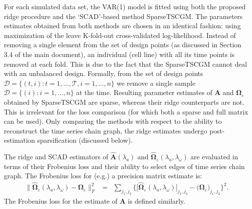 For each simulated data set, the VAR(1) model is fitted using both the proposed ridge procedure and the `SCAD'-based method SparseTSCGM. The parameters estimates obtained from both methods are chosen in an identical fashion: using maximization of the leave K-fold-out cross-validated log-likelihood. Instead of removing a single element from the set of design points (as discussed in Section 3.4 of the main document), an individual (cell line) with all its time points is removed at each fold. This is due to the fact that the SparseTSCGM cannot deal with an unbalanced design. Formally, from the set of design points $\mathcal{D} = \{ (t,i): t=1, \ldots, \mathcal{T}, i=1, \ldots, n \}$ we remove a single sample $\mathcal{D}=\{(i): i = 1, \ldots, n\}$ at the time. Resulting parameter estimates of $\mathbf{A}$ and $\boldsymbol{\Omega}_{\varepsilon}$ obtained by SparseTSCGM are sparse, whereas their ridge counterparts are not. This is irrelevant for the loss comparison (for which both a sparse and full matrix can be used). Only comparing the methods with respect to the ability to reconstruct the time series chain graph, the ridge estimates undergo post-estimation sparsification (discussed below).

The ridge and SCAD estimators of $\mathbf{\hat{A}}(\lambda_a)$ and $\widehat{\mathbf{\Omega}}_{\varepsilon}(\lambda_a, \lambda_{\omega})$ are evaluated in terms of their Frobenius loss and their ability to select edges of time series chain graph. The Frobenius loss for (e.g.) a precision  matrix estimate is:
\begin{eqnarray*}
\big\| \widehat{\mathbf{\Omega}}_{\varepsilon}(\lambda_a, \lambda_{\omega}) - \mathbf{\Omega}_{\varepsilon} \big\|_F^2  & = & \sum_{j_1, j_2} \Big\{ \big[ \widehat{\mathbf{\Omega}}_{\varepsilon}(\lambda_a, \lambda_{\omega}) ]_{j_1, j_2} - \big( \mathbf{\Omega}_{\varepsilon}
 )_{j_1, j_2} \Big\}^2.
\end{eqnarray*}
The Frobenius loss for the estimate of $\mathbf{A}$ is defined similarly.



